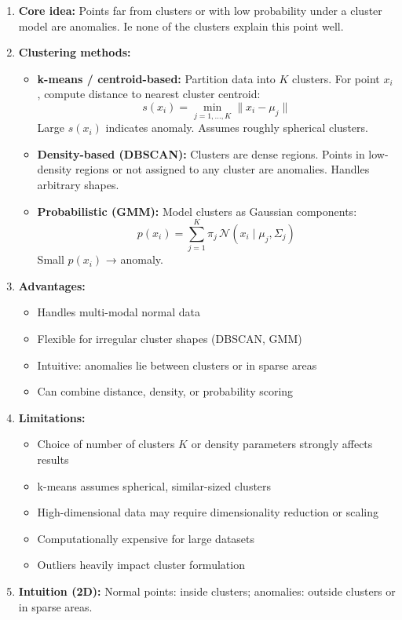 \documentclass{article}
\begin{document}
\begin{enumerate}
    \item \textbf{Core idea:} Points far from clusters or with low probability under a cluster model are anomalies. Ie none of the clusters explain this point well.

    \item \textbf{Clustering methods:}
    \begin{itemize}
        \item \textbf{k-means / centroid-based:}  
        Partition data into $K$ clusters. For point $x_i$, compute distance to nearest cluster centroid:
        \[
        s(x_i) = \min_{j=1,\dots,K} \|x_i - \mu_j\|
        \]
        Large $s(x_i)$ indicates anomaly. Assumes roughly spherical clusters.

        \item \textbf{Density-based (DBSCAN):}  
        Clusters are dense regions. Points in low-density regions or not assigned to any cluster are anomalies. Handles arbitrary shapes.

        \item \textbf{Probabilistic (GMM):}  
        Model clusters as Gaussian components:
        \[
        p(x_i) = \sum_{j=1}^K \pi_j \, \mathcal{N}(x_i \mid \mu_j, \Sigma_j)
        \]
        Small $p(x_i)$ → anomaly.
    \end{itemize}

    \item \textbf{Advantages:}
    \begin{itemize}
        \item Handles multi-modal normal data
        \item Flexible for irregular cluster shapes (DBSCAN, GMM)
        \item Intuitive: anomalies lie between clusters or in sparse areas
        \item Can combine distance, density, or probability scoring
    \end{itemize}

    \item \textbf{Limitations:}
    \begin{itemize}
        \item Choice of number of clusters $K$ or density parameters strongly affects results
        \item k-means assumes spherical, similar-sized clusters
        \item High-dimensional data may require dimensionality reduction or scaling
        \item Computationally expensive for large datasets
        \item Outliers heavily impact cluster formulation
    \end{itemize}

    \item \textbf{Intuition (2D):}  
    Normal points: inside clusters; anomalies: outside clusters or in sparse areas.
\end{enumerate}
\end{document}
